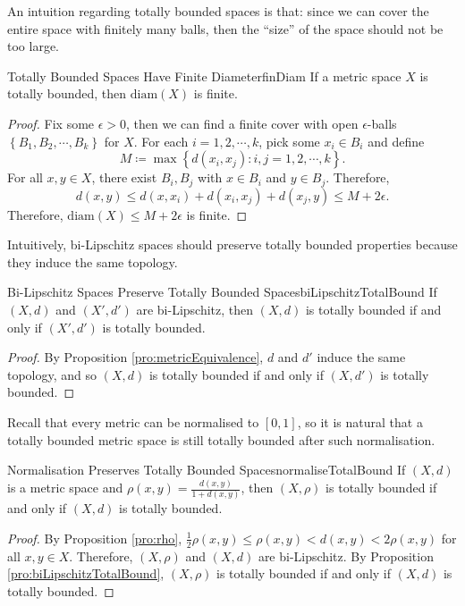 \documentclass[math]{amznotes}
\theoremstyle{remark}
\begin{document}
An intuition regarding totally bounded spaces is that: since we can cover the entire space with finitely many balls, then the ``size'' of the space should not be too large.
\begin{probox}{Totally Bounded Spaces Have Finite Diameter}{finDiam}
    If a metric space $X$ is totally bounded, then $\mathrm{diam}\left(X\right)$ is finite.
    \tcblower
    \begin{proof}
        Fix some $\epsilon > 0$, then we can find a finite cover with open $\epsilon$-balls $\left\{B_1, B_2, \cdots, B_k\right\}$ for $X$. For each $i = 1, 2, \cdots, k$, pick some $x_i \in B_i$ and define 
        \begin{equation*}
            M \coloneqq \max\left\{d\left(x_i, x_j\right) \colon i, j = 1, 2, \cdots, k\right\}.
        \end{equation*}
        For all $x, y \in X$, there exist $B_i, B_j$ with $x \in B_i$ and $y \in B_j$. Therefore,
        \begin{equation*}
            d\left(x, y\right) \leq d\left(x, x_i\right) + d\left(x_i, x_j\right) + d\left(x_j, y\right) \leq M + 2\epsilon.
        \end{equation*}
        Therefore, $\mathrm{diam}\left(X\right) \leq M + 2\epsilon$ is finite.
    \end{proof}
\end{probox}
Intuitively, bi-Lipschitz spaces should preserve totally bounded properties because they induce the same topology.
\begin{probox}{Bi-Lipschitz Spaces Preserve Totally Bounded Spaces}{biLipschitzTotalBound}
    If $\left(X, d\right)$ and $\left(X', d'\right)$ are bi-Lipschitz, then $\left(X, d\right)$ is totally bounded if and only if $\left(X', d'\right)$ is totally bounded.
    \tcblower
    \begin{proof}
        By Proposition \ref{pro:metricEquivalence}, $d$ and $d'$ induce the same topology, and so $\left(X, d\right)$ is totally bounded if and only if $\left(X, d'\right)$ is totally bounded.
    \end{proof}
\end{probox}
Recall that every metric can be normalised to $\left[0, 1\right]$, so it is natural that a totally bounded metric space is still totally bounded after such normalisation.
\begin{corbox}{Normalisation Preserves Totally Bounded Spaces}{normaliseTotalBound}
    If $\left(X, d\right)$ is a metric space and $\rho\left(x, y\right) = \frac{d\left(x, y\right)}{1 + d\left(x, y\right)}$, then $\left(X, \rho\right)$ is totally bounded if and only if $\left(X, d\right)$ is totally bounded.
    \tcblower
    \begin{proof}
        By Proposition \ref{pro:rho}, $\frac{1}{2}\rho\left(x, y\right) \leq \rho\left(x, y\right) < d\left(x, y\right) < 2\rho\left(x, y\right)$ for all $x, y \in X$. Therefore, $\left(X, \rho\right)$ and $\left(X, d\right)$ are bi-Lipschitz. By Proposition \ref{pro:biLipschitzTotalBound},  $\left(X, \rho\right)$ is totally bounded if and only if $\left(X, d\right)$ is totally bounded.
    \end{proof}
\end{corbox}
\end{document}
